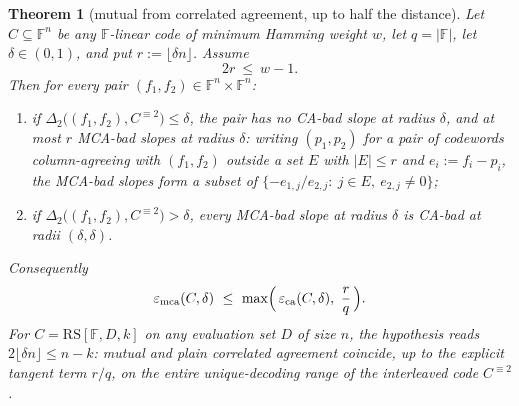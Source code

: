 \documentclass[11pt]{article}
\newtheorem{theorem}{Theorem}[section]
\theoremstyle{definition}
\theoremstyle{remark}
\newcommand{\F}{\mathbb{F}}
\newcommand{\RS}{\mathrm{RS}}
\newcommand{\eca}{\varepsilon_{\mathrm{ca}}}
\newcommand{\emca}{\varepsilon_{\mathrm{mca}}}
\newcommand{\dist}{\Delta}
\begin{document}
\begin{theorem}[mutual from correlated agreement, up to half the distance]\label{thm:mca-from-ca}
Let $C\subseteq\F^n$ be any $\F$-linear code of minimum Hamming weight $w$, let $q=|\F|$, let $\delta\in(0,1)$, and put $r:=\lfloor\delta n\rfloor$. Assume
\[
2r\ \le\ w-1 .
\]
Then for every pair $(f_1,f_2)\in\F^n\times\F^n$:
\begin{enumerate}[label=\textup{(\alph*)}]
\item if $\dist_2\bigl((f_1,f_2),C^{\equiv2}\bigr)\le\delta$, the pair has \emph{no} CA-bad slope at radius $\delta$, and at most $r$ MCA-bad slopes at radius $\delta$: writing $(p_1,p_2)$ for a pair of codewords column-agreeing with $(f_1,f_2)$ outside a set $E$ with $|E|\le r$ and $e_i:=f_i-p_i$, the MCA-bad slopes form a subset of $\{-e_{1,j}/e_{2,j}:\ j\in E,\ e_{2,j}\ne0\}$;
\item if $\dist_2\bigl((f_1,f_2),C^{\equiv2}\bigr)>\delta$, every MCA-bad slope at radius $\delta$ is CA-bad at radii $(\delta,\delta)$.
\end{enumerate}
Consequently
\[
\emca(C,\delta)\ \le\ \max\Bigl(\,\eca(C,\delta),\ \frac rq\,\Bigr).
\]
For $C=\RS[\F,D,k]$ on any evaluation set $D$ of size $n$, the hypothesis reads $2\lfloor\delta n\rfloor\le n-k$: mutual and plain correlated agreement coincide, up to the explicit tangent term $r/q$, on the entire unique-decoding range of the interleaved code $C^{\equiv2}$.
\end{theorem}
\end{document}
